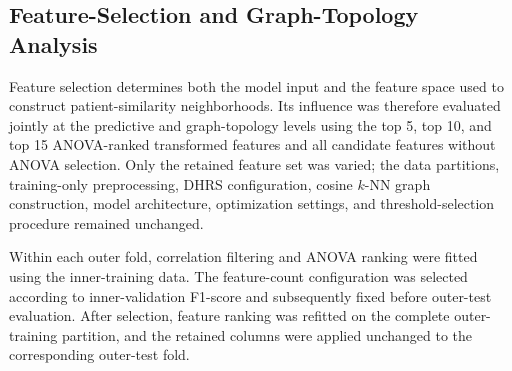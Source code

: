 \documentclass[pdflatex,sn-mathphys-num]{sn-jnl}%
\theoremstyle{thmstyleone}%
\theoremstyle{thmstyletwo}%
\theoremstyle{thmstylethree}%
\begin{document}
\subsection{Feature-Selection and Graph-Topology Analysis}
\label{subsec:feature_selection_analysis}

 {
Feature selection determines both the model input and the feature space used
to construct patient-similarity neighborhoods. Its influence was therefore
evaluated jointly at the predictive and graph-topology levels using the top 5,
top 10, and top 15 ANOVA-ranked transformed features and all candidate
features without ANOVA selection. Only the retained feature set was varied;
the data partitions, training-only preprocessing, DHRS configuration, cosine
\(k\)-NN graph construction, model architecture, optimization settings, and
threshold-selection procedure remained unchanged.
}

 {
Within each outer fold, correlation filtering and ANOVA ranking were fitted
using the inner-training data. The feature-count configuration was selected
according to inner-validation F1-score and subsequently fixed before
outer-test evaluation. After selection, feature ranking was refitted on the
complete outer-training partition, and the retained columns were applied
unchanged to the corresponding outer-test fold.
}

\begingroup
 
\end{document}
